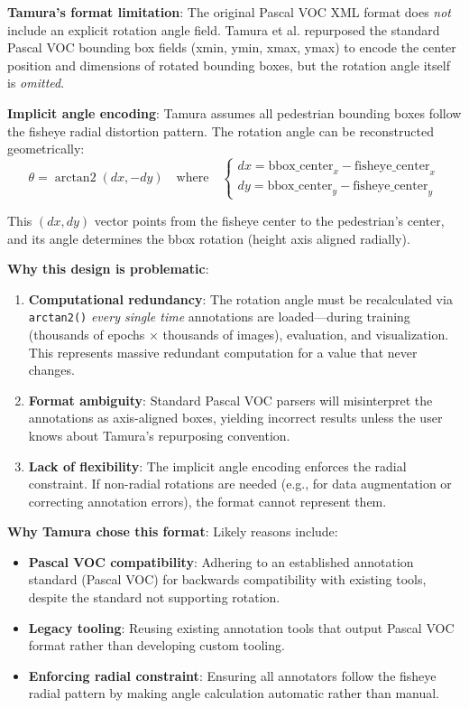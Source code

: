 \documentclass[11pt]{article}
\DeclareMathOperator{\arctantwo}{arctan2}
\begin{document}
\textbf{Tamura's format limitation}: The original Pascal VOC XML format does \textit{not} include an explicit rotation angle field. Tamura et al. repurposed the standard Pascal VOC bounding box fields (xmin, ymin, xmax, ymax) to encode the center position and dimensions of rotated bounding boxes, but the rotation angle itself is \textit{omitted}.

\textbf{Implicit angle encoding}: Tamura assumes all pedestrian bounding boxes follow the fisheye radial distortion pattern. The rotation angle can be reconstructed geometrically:
\begin{equation}
\theta = \arctantwo(dx, -dy) \quad \text{where} \quad
\begin{cases}
dx = \text{bbox\_center}_x - \text{fisheye\_center}_x \\
dy = \text{bbox\_center}_y - \text{fisheye\_center}_y
\end{cases}
\end{equation}

This $(dx, dy)$ vector points from the fisheye center to the pedestrian's center, and its angle determines the bbox rotation (height axis aligned radially).

\textbf{Why this design is problematic}:
\begin{enumerate}[leftmargin=*]
    \item \textbf{Computational redundancy}: The rotation angle must be recalculated via \texttt{arctan2()} \textit{every single time} annotations are loaded---during training (thousands of epochs $\times$ thousands of images), evaluation, and visualization. This represents massive redundant computation for a value that never changes.
    \item \textbf{Format ambiguity}: Standard Pascal VOC parsers will misinterpret the annotations as axis-aligned boxes, yielding incorrect results unless the user knows about Tamura's repurposing convention.
    \item \textbf{Lack of flexibility}: The implicit angle encoding enforces the radial constraint. If non-radial rotations are needed (e.g., for data augmentation or correcting annotation errors), the format cannot represent them.
\end{enumerate}

\textbf{Why Tamura chose this format}: Likely reasons include:
\begin{itemize}[leftmargin=*]
    \item \textbf{Pascal VOC compatibility}: Adhering to an established annotation standard (Pascal VOC) for backwards compatibility with existing tools, despite the standard not supporting rotation.
    \item \textbf{Legacy tooling}: Reusing existing annotation tools that output Pascal VOC format rather than developing custom tooling.
    \item \textbf{Enforcing radial constraint}: Ensuring all annotators follow the fisheye radial pattern by making angle calculation automatic rather than manual.
\end{itemize}
\end{document}
